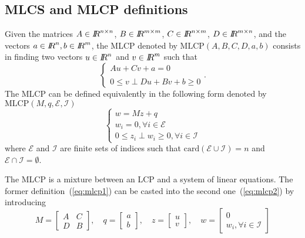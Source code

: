 \subsection{MLCS and MLCP definitions}
\begin{definition} 
  Given the matrices  ${A} \in \mbox{\rm $I\!\!R$}^{n \times n}$, ${B} \in \mbox{\rm $I\!\!R$}^{m \times m}$, ${C} \in \mbox{\rm $I\!\!R$}^{n \times m}$, ${D} \in \mbox{\rm $I\!\!R$}^{m \times n}$, and the vectors  $ {a} \in \mbox{\rm $I\!\!R$}^n, {b} \in \mbox{\rm $I\!\!R$}^m$, the MLCP denoted by $\mathrm{MLCP}(A,B,C,D,a,b)$ consists in finding two vectors $ {u} \in \mbox{\rm $I\!\!R$}^n$ and  $ {v} \in \mbox{\rm $I\!\!R$}^m$ such that
\begin{equation}\label{eq:mlcp1} 
  \begin{cases}
    A u + C v + a =0 \\  \\
    {0} \le {v} \perp     Du +B v +b   \ge {0}
  \end{cases}.
\end{equation}
The  MLCP can be defined equivalently in the following form denoted by $\mathrm{MLCP}(M,q,\mathcal E,\mathcal I)$
\begin{equation}
  \label{eq:mlcp2}
  \begin{cases}
    w = M z +q \\
    w_i=0,\forall  i \in \mathcal E \\
    {0} \le z_i \perp w_i \ge {0}, \forall  i \in \mathcal I 
 \end{cases}
\end{equation}
where  $\mathcal E$ and $\mathcal I$ are finite sets of indices such that $\mathrm{card}(\mathcal E \cup \mathcal I  ) = n$ and $\mathcal E \cap \mathcal I  = \emptyset$.\end{definition}
The MLCP is a mixture between an LCP and a system of linear equations. The former definition~(\ref{eq:mlcp1}) can be casted into the second one~(\ref{eq:mlcp2}) by introducing
\begin{equation}
  \label{eq:mlcp-m}
  M = \left[
  \begin{array}{cc}
   A & C \\
   D & B
  \end{array}\right],\quad   q = \left[
  \begin{array}{c}
    a \\
    b
  \end{array}\right],\quad   z = \left[
  \begin{array}{c}
    u \\
    v
  \end{array}\right],\quad   w = \left[
  \begin{array}{c}
    0\\
    w_i, \forall  i \in \mathcal I 
  \end{array}\right]
\end{equation}




